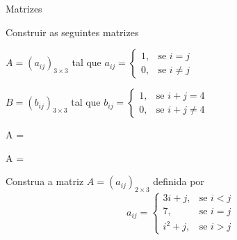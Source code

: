 \begin{exercicios}{Matrizes}
    \begin{exercicio}
        Construir as seguintes matrizes
        \begin{alphalist}
            \item $A=(a_{ij})_{3\times 3}$ tal que 
                  \( a_{ij} =\begin{cases}
                                1, & \text{se } i=j \\
                                0, & \text{se } i\neq j
                            \end{cases}  \)
            \item $B=(b_{ij})_{3\times 3}$ tal que 
                  \( b_{ij} =\begin{cases}
                                1, & \text{se } i+j=4 \\
                                0, & \text{se } i+j\neq 4
                            \end{cases}  \)
        \end{alphalist}
        \begin{answers}
            \begin{mathlist}[2]
                \item A = 
                \item A = 
            \end{mathlist}
        \end{answers}
    \end{exercicio}
    
    \begin{exercicio}
        Construa a matriz $A = (a_{ij})_{2 \times 3}$ definida por
        \[a_{ij} = \begin{cases}
            3i + j,  & \text{se } i < j \\
            7,       & \text{se } i = j \\
            i^2 + j, & \text{se } i > j
        \end{cases}\]
    \end{exercicio}
    

\end{exercicios}

